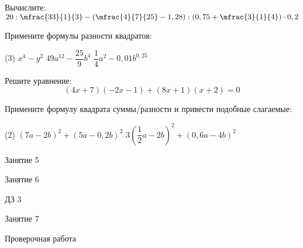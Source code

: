 \begin{homework}[number=2]
	\begin{listofex}
		\item Вычислите: \( 20 : \mfrac{33}{1}{3} - \left( \mfrac{4}{7}{25} - 1,28 \right) : \left( 0,75 + \mfrac{3}{1}{4} \right) \cdot 0,2 \)
		\item Примените формулы разности квадратов:
		\begin{tasks}(3)
			\task \( x^4-y^2 \)
			\task \( 49a^{12}-\dfrac{25}{9}b^4 \)
			\task \( \dfrac{1}{4}a^2-0,01b^{0,25} \)
		\end{tasks}
		\item Решите уравнение: \[ (4x+7)(-2x-1)+(8x+1)(x+2)=0 \]
		\item Примените формулу квадрата суммы/разности и привести подобные слагаемые:
		\begin{tasks}(2)
			\task \( (7a-2b)^2+(5a-0,2b)^2 \)
			\task \( 3\left(\dfrac{1}{2}a-2b\right)^2+(0,6a-4b)^2 \)
		\end{tasks}
	\end{listofex}
\end{homework}

\begin{class}[number=5]
	\begin{listofex}
		\item Занятие 5
	\end{listofex}
\end{class}

\begin{class}[number=6]
	\begin{listofex}
		\item Занятие 6
	\end{listofex}
\end{class}

\begin{homework}[number=3]
	\begin{listofex}
		\item ДЗ 3
	\end{listofex}
\end{homework}

\begin{class}[number=7]
	\begin{listofex}
		\item Занятие 7
	\end{listofex}
\end{class}

\begin{exam}
	\begin{listofex}
		\item Проверочная работа
	\end{listofex}
\end{exam}
